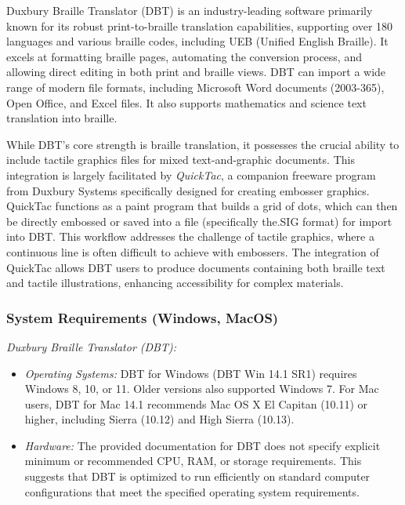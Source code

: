 Duxbury Braille Translator (DBT) is an industry-leading software primarily known for its robust print-to-braille translation capabilities, supporting over 180 languages and various braille codes, including UEB (Unified English Braille).\cite{DuxburyDetails,PerkinsTouchMapper,ViewplusTSS,IrieBrailleTrac,ElitaElPicsPrint,ViewplusTigerSuite} It excels at formatting braille pages, automating the conversion process, and allowing direct editing in both print and braille views.\cite{PerkinsTouchMapper} DBT can import a wide range of modern file formats, including Microsoft Word documents (2003-365), Open Office, and Excel files.\cite{PerkinsTouchMapper,IrieBrailleTrac,ElitaElPicsPrint,ViewplusTigerSuite} It also supports mathematics and science text translation into braille.\cite{PerkinsTouchMapper,ElitaElPicsPrint,ViewplusTigerSuite}

While DBT's core strength is braille translation, it possesses the crucial ability to include tactile graphics files for mixed text-and-graphic documents.\cite{TouchMapper,PerkinsTouchMapper,ElitaElPicsPrint} This integration is largely facilitated by \emph{QuickTac}, a companion freeware program from Duxbury Systems specifically designed for creating embosser graphics.\cite{TouchMapper,ElitaElPicsPrint,ViewplusTSS,DuxburyDetails,SoftorageInkscape} QuickTac functions as a paint program that builds a grid of dots, which can then be directly embossed or saved into a file (specifically the.SIG format) for import into DBT.\cite{TouchMapper,DuxburyDetails} This workflow addresses the challenge of tactile graphics, where a continuous line is often difficult to achieve with embossers.\cite{ViewplusTSS} The integration of QuickTac allows DBT users to produce documents containing both braille text and tactile illustrations, enhancing accessibility for complex materials.\cite{TouchMapper,DuxburyDetails,PerkinsTouchMapper,ElitaElPicsPrint}

\subsubsection{System Requirements (Windows, MacOS)}

\emph{Duxbury Braille Translator (DBT):}
\begin{itemize}
    \item \emph{Operating Systems:} DBT for Windows (DBT Win 14.1 SR1) requires Windows 8, 10, or 11.\cite{PerkinsTouchMapper,IrieBrailleTrac,ElitaElPicsPrint} Older versions also supported Windows 7.\cite{ElitaElPicsPrint} For Mac users, DBT for Mac 14.1 recommends Mac OS X El Capitan (10.11) or higher, including Sierra (10.12) and High Sierra (10.13).\cite{IrieBrailleTrac,ElitaElPicsPrint}
    \item \emph{Hardware:} The provided documentation for DBT does not specify explicit minimum or recommended CPU, RAM, or storage requirements.\cite{PerkinsTouchMapper,ViewplusTSS,IrieBrailleTrac,ElitaElPicsPrint,DuxburyDetails} This suggests that DBT is optimized to run efficiently on standard computer configurations that meet the specified operating system requirements.
\end{itemize}


